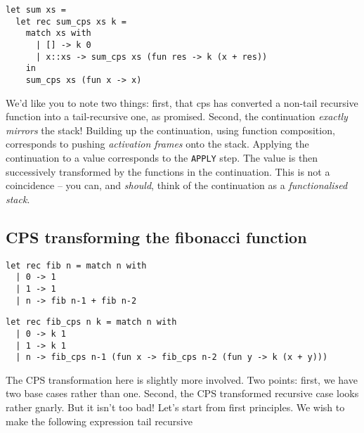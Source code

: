 \begin{code}
\label{code:sum-cps-wrapped-ocaml}
\begin{verbatim}
let sum xs = 
  let rec sum_cps xs k = 
    match xs with
      | [] -> k 0
      | x::xs -> sum_cps xs (fun res -> k (x + res))
    in
    sum_cps xs (fun x -> x)
\end{verbatim}
\end{code}

We'd like you to note two things: first, that cps has converted a non-tail recursive function into a tail-recursive one, as promised. Second, the continuation \emph{exactly mirrors} the stack! Building up the continuation, using function composition, corresponds to pushing \emph{activation frames} onto the stack. Applying the continuation to a value corresponds to the \texttt{APPLY} step. The value is then successively transformed by the functions in the continuation. This is not a coincidence -- you can, and \emph{should}, think of the continuation as a \emph{functionalised stack}. 

\subsection{CPS transforming the fibonacci function}
\label{subsection:cps-fib}
\begin{code}
\label{code:fib-ocaml-again}
\begin{verbatim}
let rec fib n = match n with
  | 0 -> 1
  | 1 -> 1
  | n -> fib n-1 + fib n-2
\end{verbatim}
\end{code}

\begin{code}
\label{code:fib-cps-ocaml}
\begin{verbatim}
let rec fib_cps n k = match n with
  | 0 -> k 1
  | 1 -> k 1
  | n -> fib_cps n-1 (fun x -> fib_cps n-2 (fun y -> k (x + y)))
\end{verbatim}
\end{code}

The CPS transformation here is slightly more involved. Two points: first, we have two base cases rather than one. Second, the CPS transformed recursive case looks rather gnarly. But it isn't too bad! Let's start from first principles. We wish to make the following expression tail recursive 

